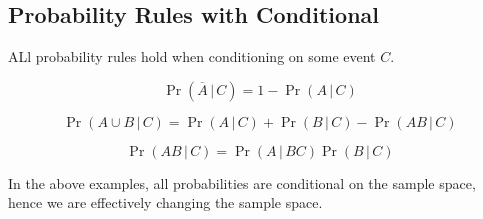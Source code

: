 \documentclass{article}
\begin{document}
\subsection{Probability Rules with Conditional}
ALl probability rules hold when conditioning on some event \(C\).
\begin{theorem}
    \begin{equation*}
        \Pr{\left( \overline{A} \,\vert\, C \right)} = 1 - \Pr{\left( A \,\vert\, C \right)}
    \end{equation*}
\end{theorem}
\begin{theorem}
    \begin{equation*}
        \Pr{\left( A \cup B \,\vert\, C \right)} = \Pr{\left( A \,\vert\, C \right)} + \Pr{\left( B \,\vert\, C \right)} - \Pr{\left( AB \,\vert\, C \right)}
    \end{equation*}
\end{theorem}
\begin{theorem}
    \begin{equation*}
        \Pr{\left( A B \,\vert\, C \right)} = \Pr{\left( A \,\vert\, BC \right)} \Pr{\left( B \,\vert\, C \right)}
    \end{equation*}
\end{theorem}
In the above examples, all probabilities are conditional on the sample space, hence we are effectively
changing the sample space.
\end{document}

